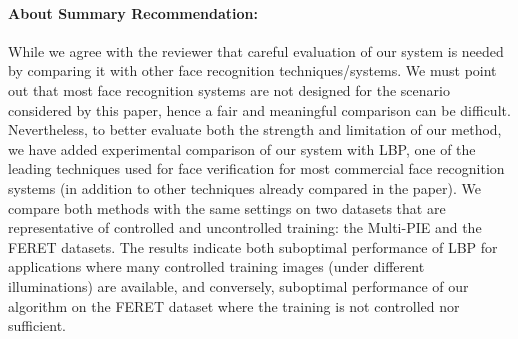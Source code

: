 \documentclass[11pt]{article}
\begin{document}
\paragraph{About Summary Recommendation:} While we agree with the reviewer that careful evaluation of our
system is needed by comparing it with other face recognition techniques/systems. We must point out that most face recognition systems are not designed for the scenario considered by this paper, hence a fair and meaningful comparison can be difficult. Nevertheless, to better evaluate both the strength and limitation of our method, we have added experimental comparison of our system with LBP, one of the leading techniques used for face verification for most commercial face recognition systems (in addition to other techniques already compared in the paper). We compare both methods with the same settings on two datasets that are representative of controlled and uncontrolled training: the Multi-PIE and the FERET
datasets.  The results indicate both suboptimal performance of LBP for applications where many controlled training images (under different illuminations) are available, and conversely, suboptimal performance of our algorithm on the FERET dataset where the training is not controlled nor sufficient.
\end{document}
